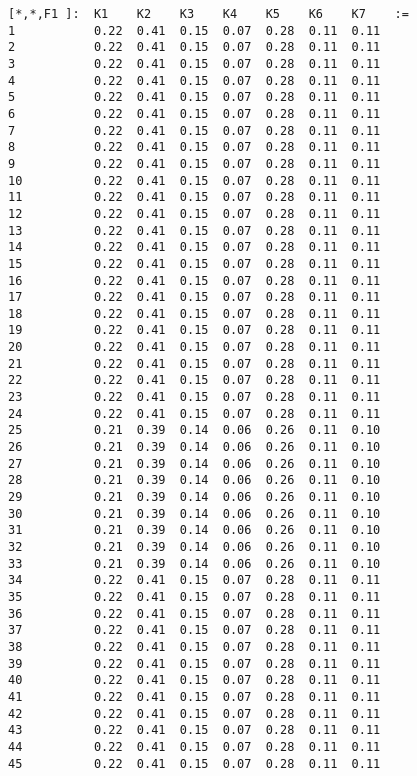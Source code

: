 \begin{lstlisting}
[*,*,F1 ]:  K1    K2    K3    K4    K5    K6    K7    :=
1           0.22  0.41  0.15  0.07  0.28  0.11  0.11
2           0.22  0.41  0.15  0.07  0.28  0.11  0.11
3           0.22  0.41  0.15  0.07  0.28  0.11  0.11
4           0.22  0.41  0.15  0.07  0.28  0.11  0.11
5           0.22  0.41  0.15  0.07  0.28  0.11  0.11
6           0.22  0.41  0.15  0.07  0.28  0.11  0.11
7           0.22  0.41  0.15  0.07  0.28  0.11  0.11
8           0.22  0.41  0.15  0.07  0.28  0.11  0.11
9           0.22  0.41  0.15  0.07  0.28  0.11  0.11
10          0.22  0.41  0.15  0.07  0.28  0.11  0.11
11          0.22  0.41  0.15  0.07  0.28  0.11  0.11
12          0.22  0.41  0.15  0.07  0.28  0.11  0.11
13          0.22  0.41  0.15  0.07  0.28  0.11  0.11
14          0.22  0.41  0.15  0.07  0.28  0.11  0.11
15          0.22  0.41  0.15  0.07  0.28  0.11  0.11
16          0.22  0.41  0.15  0.07  0.28  0.11  0.11
17          0.22  0.41  0.15  0.07  0.28  0.11  0.11
18          0.22  0.41  0.15  0.07  0.28  0.11  0.11
19          0.22  0.41  0.15  0.07  0.28  0.11  0.11
20          0.22  0.41  0.15  0.07  0.28  0.11  0.11
21          0.22  0.41  0.15  0.07  0.28  0.11  0.11
22          0.22  0.41  0.15  0.07  0.28  0.11  0.11
23          0.22  0.41  0.15  0.07  0.28  0.11  0.11
24          0.22  0.41  0.15  0.07  0.28  0.11  0.11
25          0.21  0.39  0.14  0.06  0.26  0.11  0.10
26          0.21  0.39  0.14  0.06  0.26  0.11  0.10
27          0.21  0.39  0.14  0.06  0.26  0.11  0.10
28          0.21  0.39  0.14  0.06  0.26  0.11  0.10
29          0.21  0.39  0.14  0.06  0.26  0.11  0.10
30          0.21  0.39  0.14  0.06  0.26  0.11  0.10
31          0.21  0.39  0.14  0.06  0.26  0.11  0.10
32          0.21  0.39  0.14  0.06  0.26  0.11  0.10
33          0.21  0.39  0.14  0.06  0.26  0.11  0.10
34          0.22  0.41  0.15  0.07  0.28  0.11  0.11
35          0.22  0.41  0.15  0.07  0.28  0.11  0.11
36          0.22  0.41  0.15  0.07  0.28  0.11  0.11
37          0.22  0.41  0.15  0.07  0.28  0.11  0.11
38          0.22  0.41  0.15  0.07  0.28  0.11  0.11
39          0.22  0.41  0.15  0.07  0.28  0.11  0.11
40          0.22  0.41  0.15  0.07  0.28  0.11  0.11
41          0.22  0.41  0.15  0.07  0.28  0.11  0.11
42          0.22  0.41  0.15  0.07  0.28  0.11  0.11
43          0.22  0.41  0.15  0.07  0.28  0.11  0.11
44          0.22  0.41  0.15  0.07  0.28  0.11  0.11
45          0.22  0.41  0.15  0.07  0.28  0.11  0.11


\end{lstlisting}

